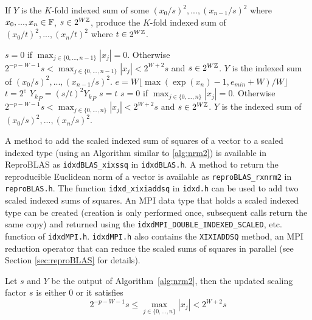     \begin{samepage}
    \begin{alg}
      If $Y$ is the $K$-fold indexed sum of some $(x_0/s)^2, ..., (x_{n - 1}/s)^2$ where $x_0, ..., x_{n} \in \mathbb{F}$, $s \in 2^{W\mathbb{Z}}$, produce the $K$-fold indexed sum of $(x_0/t)^2, ..., (x_{n}/t)^2$ where $t \in 2^{W\mathbb{Z}}$. 
      \begin{algorithmic}[1]
        \Require
        \Statex $s=0$ if $\max_{j \in \{0, ..., n - 1\}}|x_j| = 0$.
        Otherwise $2^{-p-W-1} s < \max_{j \in \{0, ..., n - 1\}}|x_j| < 2^{W+2} s$
        and $s \in 2^{W\mathbb{Z}}$.
        \Statex $Y$ is the indexed sum of $(x_0/s)^2, ..., (x_{n-1}/s)^2$.
          \State $e = W \lfloor\max(\exp(x_n) - 1,e_{min}+W) / W\rfloor$
              \label{alg:nrm2.line.e}
          \State $t = 2^e$
                  \State ${Y_k}_P = (s/t)^2 {Y_k}_P$
              \EndFor
              \State $s = t$
          \EndIf
        \State {}
      \EndFunction
      \Ensure
      \Statex $s=0$ if $\max_{j \in \{0, ..., n\}}|x_j| = 0$.
      Otherwise $2^{-p-W-1} s < \max_{j \in \{0, ..., n\}}|x_j| < 2^{W+2} s$
      and $s \in 2^{W\mathbb{Z}}$.
      \Statex $Y$ is the indexed sum of $(x_0/s)^2, ..., (x_{n}/s)^2$.
      \end{algorithmic}
      \label{alg:nrm2}
    \end{alg}
    \end{samepage}

    A method to add the scaled indexed sum of squares of a vector to a scaled indexed type (using an Algorithm similar to \ref{alg:nrm2}) is available in ReproBLAS as \texttt{idxdBLAS\_xixssq} in \texttt{idxdBLAS.h}. A method to return the reproducible Euclidean norm of a vector is available as \texttt{reproBLAS\_rxnrm2} in \texttt{reproBLAS.h}. The function \texttt{idxd\_xixiaddsq} in \texttt{idxd.h} can be used to add two scaled indexed sums of squares. An MPI data type that holds a scaled indexed type can be created (creation is only performed once, subsequent calls return the same copy) and returned using the \texttt{idxdMPI\_DOUBLE\_INDEXED\_SCALED}, etc. function of \texttt{idxdMPI.h}. \texttt{idxdMPI.h} also contains the \texttt{XIXIADDSQ} method, an MPI reduction operator that can reduce the scaled sums of squares in parallel (see Section \ref{sec:reproBLAS} for details).


    \begin{lem}
    \label{lem:nrm2_scaling}
    Let $s$ and $Y$ be the output of Algorithm~\ref{alg:nrm2}, then the updated scaling factor $s$ is either $0$ or it satisfies
    \begin{equation}
        2^{-p-W-1}s \leq \max_{j \in \{0, ..., n\}}|x_j| < 2^{W+2} s
    \end{equation}
    \end{lem}

